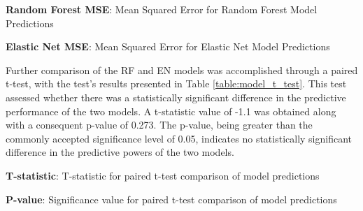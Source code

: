 \documentclass[11pt]{article}
\begin{document}
\begin{table}[h]
\caption{Mean Squared Error Comparisons for Machine Learning Models}
\label{table:model_mse_comparison}
\begin{threeparttable}
\renewcommand{\TPTminimum}{\linewidth}
\begin{tablenotes}
\footnotesize
\item \textbf{Random Forest MSE}: Mean Squared Error for Random Forest Model Predictions
\item \textbf{Elastic Net MSE}: Mean Squared Error for Elastic Net Model Predictions
\end{tablenotes}
\end{threeparttable}
\end{table}


Further comparison of the RF and EN models was accomplished through a paired t-test, with the test's results presented in Table \ref{table:model_t_test}. This test assessed whether there was a statistically significant difference in the predictive performance of the two models. A t-statistic value of -1.1 was obtained along with a consequent p-value of 0.273. The p-value, being greater than the commonly accepted significance level of 0.05, indicates no statistically significant difference in the predictive powers of the two models.

\begin{table}[h]
\caption{Statistical Test Comparisons for Model Predictions}
\label{table:model_t_test}
\begin{threeparttable}
\renewcommand{\TPTminimum}{\linewidth}
\begin{tablenotes}
\footnotesize
\item \textbf{T-statistic}: T-statistic for paired t-test comparison of model predictions
\item \textbf{P-value}: Significance value for paired t-test comparison of model predictions
\end{tablenotes}
\end{threeparttable}
\end{table}
\end{document}
